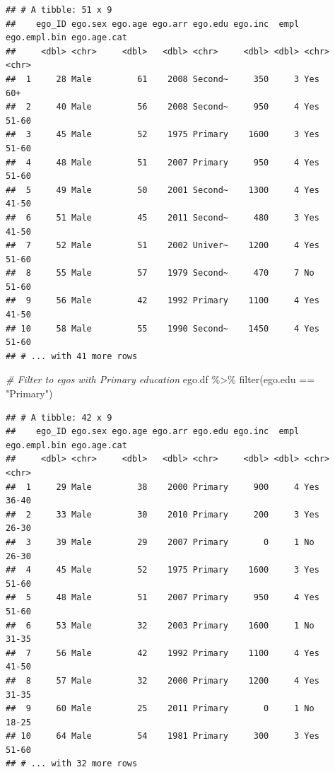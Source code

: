 \documentclass[
]{book}
\newenvironment{Shaded}{\begin{snugshade}}{\end{snugshade}}
\newcommand{\CommentTok}[1]{\textcolor[rgb]{0.56,0.35,0.01}{\textit{#1}}}
\newcommand{\FunctionTok}[1]{\textcolor[rgb]{0.00,0.00,0.00}{#1}}
\newcommand{\NormalTok}[1]{#1}
\newcommand{\SpecialCharTok}[1]{\textcolor[rgb]{0.00,0.00,0.00}{#1}}
\newcommand{\StringTok}[1]{\textcolor[rgb]{0.31,0.60,0.02}{#1}}
\begin{document}
\begin{verbatim}
## # A tibble: 51 x 9
##    ego_ID ego.sex ego.age ego.arr ego.edu ego.inc  empl ego.empl.bin ego.age.cat
##     <dbl> <chr>     <dbl>   <dbl> <chr>     <dbl> <dbl> <chr>        <chr>      
##  1     28 Male         61    2008 Second~     350     3 Yes          60+        
##  2     40 Male         56    2008 Second~     950     4 Yes          51-60      
##  3     45 Male         52    1975 Primary    1600     3 Yes          51-60      
##  4     48 Male         51    2007 Primary     950     4 Yes          51-60      
##  5     49 Male         50    2001 Second~    1300     4 Yes          41-50      
##  6     51 Male         45    2011 Second~     480     3 Yes          41-50      
##  7     52 Male         51    2002 Univer~    1200     4 Yes          51-60      
##  8     55 Male         57    1979 Second~     470     7 No           51-60      
##  9     56 Male         42    1992 Primary    1100     4 Yes          41-50      
## 10     58 Male         55    1990 Second~    1450     4 Yes          51-60      
## # ... with 41 more rows
\end{verbatim}

\begin{Shaded}
\begin{Highlighting}[]
\CommentTok{\# Filter to egos with Primary education}
\NormalTok{ego.df }\SpecialCharTok{\%\textgreater{}\%}
  \FunctionTok{filter}\NormalTok{(ego.edu }\SpecialCharTok{==} \StringTok{"Primary"}\NormalTok{)}
\end{Highlighting}
\end{Shaded}

\begin{verbatim}
## # A tibble: 42 x 9
##    ego_ID ego.sex ego.age ego.arr ego.edu ego.inc  empl ego.empl.bin ego.age.cat
##     <dbl> <chr>     <dbl>   <dbl> <chr>     <dbl> <dbl> <chr>        <chr>      
##  1     29 Male         38    2000 Primary     900     4 Yes          36-40      
##  2     33 Male         30    2010 Primary     200     3 Yes          26-30      
##  3     39 Male         29    2007 Primary       0     1 No           26-30      
##  4     45 Male         52    1975 Primary    1600     3 Yes          51-60      
##  5     48 Male         51    2007 Primary     950     4 Yes          51-60      
##  6     53 Male         32    2003 Primary    1600     1 No           31-35      
##  7     56 Male         42    1992 Primary    1100     4 Yes          41-50      
##  8     57 Male         32    2000 Primary    1200     4 Yes          31-35      
##  9     60 Male         25    2011 Primary       0     1 No           18-25      
## 10     64 Male         54    1981 Primary     300     3 Yes          51-60      
## # ... with 32 more rows
\end{verbatim}
\end{document}
